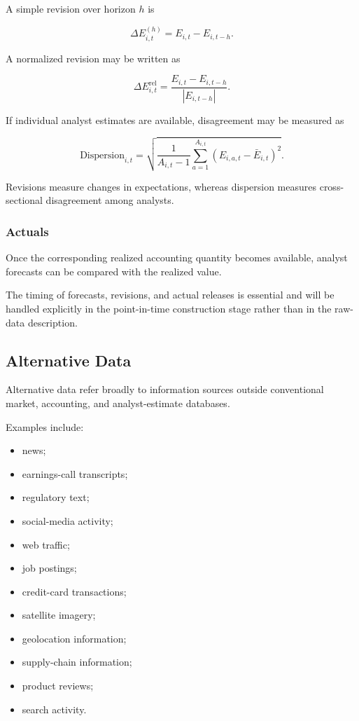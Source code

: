 \documentclass[11pt,a4paper]{article}
\begin{document}
A simple revision over horizon $h$ is

\begin{equation}
\boxed{
\Delta E_{i,t}^{(h)}
=
E_{i,t}
-
E_{i,t-h}.
}
\end{equation}

A normalized revision may be written as

\begin{equation}
\Delta E_{i,t}^{\mathrm{rel}}
=
\frac{
E_{i,t}-E_{i,t-h}
}{
|E_{i,t-h}|
}.
\end{equation}

If individual analyst estimates are available, disagreement may be measured as

\begin{equation}
\mathrm{Dispersion}_{i,t}
=
\sqrt{
\frac{1}{A_{i,t}-1}
\sum_{a=1}^{A_{i,t}}
\left(
E_{i,a,t}
-
\bar{E}_{i,t}
\right)^2
}.
\end{equation}

Revisions measure changes in expectations, whereas dispersion measures
cross-sectional disagreement among analysts.


\subsubsection{Actuals}

Once the corresponding realized accounting quantity becomes available, analyst
forecasts can be compared with the realized value.

The timing of forecasts, revisions, and actual releases is essential and will
be handled explicitly in the point-in-time construction stage rather than in
the raw-data description.


\subsection{Alternative Data}
\label{subsec:alternative_data}

Alternative data refer broadly to information sources outside conventional
market, accounting, and analyst-estimate databases.

Examples include:

\begin{itemize}
    \item news;
    \item earnings-call transcripts;
    \item regulatory text;
    \item social-media activity;
    \item web traffic;
    \item job postings;
    \item credit-card transactions;
    \item satellite imagery;
    \item geolocation information;
    \item supply-chain information;
    \item product reviews;
    \item search activity.
\end{itemize}
\end{document}
